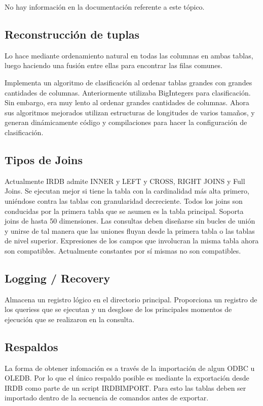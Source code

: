 \documentclass{acmart}
\begin{document}
No hay información en la documentación referente a este tópico.

\subsection{Reconstrucción de tuplas}

Lo hace mediante ordenamiento natural en todas las columnas en ambas tablas, luego haciendo una fusión entre ellas para encontrar las filas comunes.

Implementa un algoritmo de clasificación al ordenar tablas grandes con grandes cantidades de columnas. Anteriormente utilizaba BigIntegers para clasificación. Sin embargo, era muy lento al ordenar grandes cantidades de columnas. Ahora sus algoritmos mejorados utilizan estructuras de longitudes de varios tamaños, y generan dinámicamente código y compilaciones para hacer la configuración de clasificación.

\subsection{Tipos de Joins}

Actualmente IRDB admite INNER y LEFT y CROSS, RIGHT JOINS y Full Joins. Se ejecutan mejor si tiene la tabla con la cardinalidad más alta primero, uniéndose contra las tablas con granularidad decreciente. Todos los joins son conducidas por la primera tabla que se asumen es la tabla principal. Soporta joins de hasta 50 dimensiones. Las consultas deben diseñarse sin bucles de unión y unirse de tal manera que las uniones fluyan desde la primera tabla o las tablas de nivel superior. Expresiones de los campos que involucran la misma tabla ahora son compatibles. Actualmente constantes por sí mismas no son compatibles.

\subsection{Logging / Recovery}

Almacena un registro lógico en el directorio principal. Proporciona un registro de los queriess que se ejecutan y un desglose de los principales momentos de ejecución que se realizaron en la consulta.

\subsection{Respaldos}

La forma de obtener infomación es a través de la importación de algun ODBC u OLEDB. Por lo que el único respaldo posible es mediante la exportación desde IRDB como parte de un script IRDBIMPORT. Para esto las tablas deben ser importado dentro de la secuencia de comandos antes de exportar.
\end{document}
